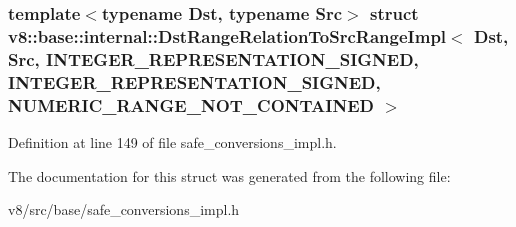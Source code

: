 \subsubsection*{template$<$typename Dst, typename Src$>$\newline
struct v8\+::base\+::internal\+::\+Dst\+Range\+Relation\+To\+Src\+Range\+Impl$<$ Dst, Src, I\+N\+T\+E\+G\+E\+R\+\_\+\+R\+E\+P\+R\+E\+S\+E\+N\+T\+A\+T\+I\+O\+N\+\_\+\+S\+I\+G\+N\+E\+D, I\+N\+T\+E\+G\+E\+R\+\_\+\+R\+E\+P\+R\+E\+S\+E\+N\+T\+A\+T\+I\+O\+N\+\_\+\+S\+I\+G\+N\+E\+D, N\+U\+M\+E\+R\+I\+C\+\_\+\+R\+A\+N\+G\+E\+\_\+\+N\+O\+T\+\_\+\+C\+O\+N\+T\+A\+I\+N\+E\+D $>$}



Definition at line 149 of file safe\+\_\+conversions\+\_\+impl.\+h.



The documentation for this struct was generated from the following file\+:\begin{DoxyCompactItemize}
\item 
v8/src/base/safe\+\_\+conversions\+\_\+impl.\+h\end{DoxyCompactItemize}
